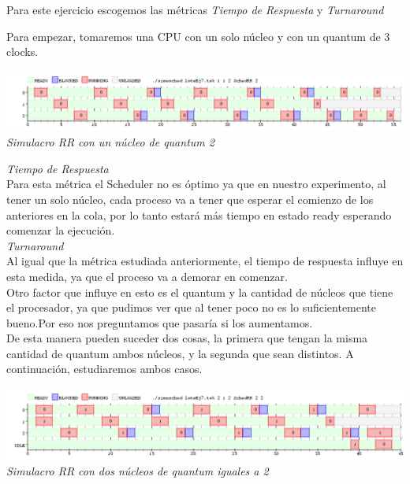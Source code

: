 Para este ejercicio escogemos las m\'etricas \textit{Tiempo de Respuesta} y \textit{Turnaround}

Para empezar, tomaremos una CPU con un solo n\'ucleo y con un quantum de 3 clocks.\\
\vspace{\baselineskip}
\begin{center}
\includegraphics[scale=0.45]{../tp1/Test/resEj7Co1.png}
\\
\vspace{1pt}
\footnotesize\textit{Simulacro RR con un n\'ucleo de quantum 2}
\end{center}
\vspace{\baselineskip}


\textit{Tiempo de Respuesta}\\
Para esta m\'etrica el Scheduler no es \'optimo ya que en nuestro experimento, al tener un solo n\'ucleo, cada proceso va a tener que esperar el comienzo de los anteriores en la cola, por lo tanto estar\'a m\'as tiempo en estado ready esperando comenzar la ejecuci\'on.\\
\textit{Turnaround}\\
Al igual que la m\'etrica estudiada anteriormente, el tiempo de respuesta influye en esta medida, ya que el proceso va a demorar en comenzar. \\
Otro factor que influye en esto es el quantum y la cantidad de n\'ucleos que tiene el procesador, ya que pudimos ver que al tener poco no es lo suficientemente bueno.Por eso nos preguntamos que pasar\'ia si los aumentamos.\\
De esta manera pueden suceder dos cosas, la primera que tengan la misma cantidad de quantum ambos n\'ucleos, y la segunda que sean distintos.
A continuaci\'on, estudiaremos ambos casos.\\
\vspace{\baselineskip}
\begin{center}
\includegraphics[scale=0.45]{../tp1/Test/resEj7Co2.png}
\\
\vspace{1pt}
\footnotesize\textit{Simulacro RR con dos n\'ucleos de quantum iguales a 2}
\end{center}
\vspace{\baselineskip}

